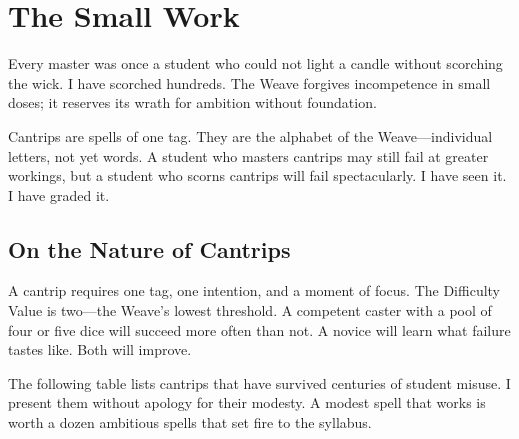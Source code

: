 \section{The Small Work}

Every master was once a student who could not light a candle without scorching the wick. I have scorched hundreds. The Weave forgives incompetence in small doses; it reserves its wrath for ambition without foundation.

Cantrips are spells of one tag. They are the alphabet of the Weave---individual letters, not yet words. A student who masters cantrips may still fail at greater workings, but a student who scorns cantrips will fail spectacularly. I have seen it. I have graded it.

\subsection{On the Nature of Cantrips}

A cantrip requires one tag, one intention, and a moment of focus. The Difficulty Value is two---the Weave's lowest threshold. A competent caster with a pool of four or five dice will succeed more often than not. A novice will learn what failure tastes like. Both will improve.

The following table lists cantrips that have survived centuries of student misuse. I present them without apology for their modesty. A modest spell that works is worth a dozen ambitious spells that set fire to the syllabus.

